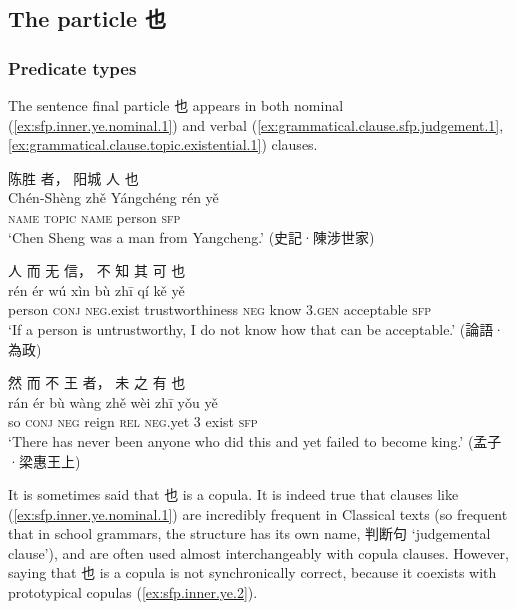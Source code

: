\documentclass[UTF8, a4paper, oneside, scheme=plain, 12pt]{ctexrep}
\newcommand{\translate}[1]{`#1'}
\newcommand*{\category}[1]{\textsc{#1}}
\begin{document}
\subsection{The particle 也}

\subsubsection{Predicate types}

The sentence final particle 也 appears in both nominal (\ref{ex:sfp.inner.ye.nominal.1}) and verbal (\ref{ex:grammatical.clause.sfp.judgement.1}, \ref{ex:grammatical.clause.topic.existential.1}) clauses.

\begin{exe}
    \ex\label{ex:sfp.inner.ye.nominal.1}
    \glll 陈胜 者， 阳城 人 也 \\
    Chén-Shèng zhě Yángchéng rén yě \\
    \category{name} \category{topic} \category{name} person \category{sfp} \\
    \glt\translate{Chen Sheng was a man from Yangcheng.} \hfill (史記·陳涉世家)

    \ex\label{ex:grammatical.clause.sfp.judgement.1}
    \glll 人 而 无 信， 不 知 其 可 也 \\
    rén ér wú xìn bù zhī qí kě yě \\
    person \category{conj} \category{neg}.exist trustworthiness \category{neg} know 3.\category{gen} acceptable \category{sfp} \\
    \glt\translate{If a person is untrustworthy, I do not know how that can be acceptable.} \hfill (論語·為政)

    \ex\label{ex:grammatical.clause.topic.existential.1}
    \glll 然 而 不 王 者， 未 之 有 也 \\
    rán ér bù wàng zhě wèi zhī yǒu yě \\
    so \category{conj} \category{neg} reign \category{rel} \category{neg}.yet 3 exist \category{sfp} \\
    \glt\translate{There has never been anyone who did this and yet failed to become king.} \hfill (孟子·梁惠王上)
\end{exe}

It is sometimes said that 也 is a copula.
It is indeed true that clauses like (\ref{ex:sfp.inner.ye.nominal.1}) are incredibly frequent in Classical texts (so frequent that in school grammars, the structure has its own name, 判断句 \translate{judgemental clause}), and are often used almost interchangeably with copula clauses.
However, saying that 也 is a copula is not synchronically correct, because it coexists with prototypical copulas (\ref{ex:sfp.inner.ye.2}).
\end{document}
